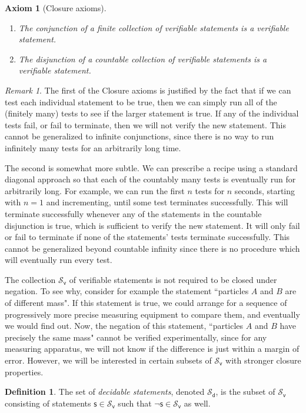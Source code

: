 \documentclass[psamsfonts]{amsart}
\newtheorem{axiom}[thm]{Axiom}
\theoremstyle{definition}
\newtheorem{defn}[thm]{Definition}
\theoremstyle{remark}
\newtheorem{rem}[thm]{Remark}
\numberwithin{equation}{section}
\def\vstmtSet{\mathcal{S}_\textsf{v}}
\def\dstmtSet{\mathcal{S}_\textsf{d}}
\def\NOT{\neg}
\newcommand{\stmt}[1][s] {\mathsf{#1}}
\begin{document}
\begin{axiom}[Closure axioms]
\begin{enumerate}
\item	The conjunction of a finite collection of verifiable statements is a verifiable statement. 
\item The disjunction of a countable collection of verifiable statements is a verifiable statement. 
\end{enumerate}
\end{axiom}

\begin{rem}
The first of the Closure axioms is justified by the fact that if we can test each individual statement to be true, then we can simply run all of the (finitely many) tests to see if the larger statement is true. If any of the individual tests fail, or fail to terminate, then we will not verify the new statement. This cannot be generalized to infinite conjunctions, since there is no way to run infinitely many tests for an arbitrarily long time. 

The second is somewhat more subtle. We can prescribe a recipe using a standard diagonal approach so that each of the countably many tests is eventually run for arbitrarily long. For example, we can run the first $n$ tests for $n$ seconds, starting with $n=1$ and incrementing, until some test terminates successfully. This will terminate successfully whenever any of the statements in the countable disjunction is true, which is sufficient to verify the new statement. It will only fail or fail to terminate if none of the statements' tests terminate successfully. This cannot be generalized beyond countable infinity since there is no procedure which will eventually run every test. 
\end{rem} 

The collection $\vstmtSet$ of verifiable statements is not required to be closed under negation. To see why, consider for example the statement ``particles $A$ and $B$ are of different mass". If this statement is true, we could arrange for a sequence of progressively more precise measuring equipment to compare them, and eventually we would find out. Now, the negation of this statement, ``particles $A$ and $B$ have precisely the same mass" cannot be verified experimentally, since for any measuring apparatus, we will not know if the difference is just within a margin of error. However, we will be interested in certain subsets of $\vstmtSet$ with stronger closure properties. 

\begin{defn}
The set of \emph{decidable statements}, denoted $\dstmtSet$, is the subset of $\vstmtSet$ consisting of statements $\stmt\in\vstmtSet$ such that $\NOT\stmt\in\vstmtSet$ as well. 
\end{defn} 
\end{document}
